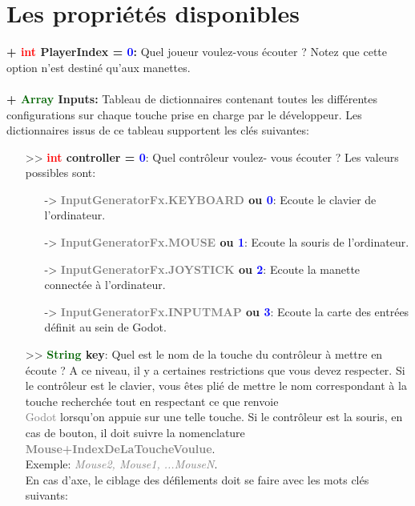 \documentclass[a4paper, 11pt]{article}
\begin{document}
	\section{Les propriétés disponibles}
	\textbf{+ \textcolor{red}{int} PlayerIndex = \textcolor{blue}{0}:} Quel joueur voulez-vous écouter ? 
	Notez que cette option n'est destiné qu'aux manettes.\\\\
	\textbf{+ \textcolor{darkgreen}{Array} Inputs:} Tableau de dictionnaires contenant toutes les 
	différentes configurations sur chaque touche prise en charge par le développeur. Les dictionnaires issus 
	de ce tableau supportent les clés suivantes:
	\begin{itemize}
		\item[>> \textbf{\textcolor{red}{int} controller = \textcolor{blue}{0}}:] Quel contrôleur voulez-
		vous écouter ? Les valeurs possibles sont:
		\begin{itemize}
			\item[-> \textbf{\textcolor{gray}{InputGeneratorFx.KEYBOARD} ou \textcolor{blue}{0}}:] Ecoute le 
			clavier de l'ordinateur.
			\item[-> \textbf{\textcolor{gray}{InputGeneratorFx.MOUSE} ou \textcolor{blue}{1}}:] Ecoute la 
			souris de l'ordinateur.
			\item[-> \textbf{\textcolor{gray}{InputGeneratorFx.JOYSTICK} ou \textcolor{blue}{2}}:] Ecoute la 
			manette connectée à l'ordinateur.
			\item[-> \textbf{\textcolor{gray}{InputGeneratorFx.INPUTMAP} ou \textcolor{blue}{3}}:] Ecoute la 
			carte des entrées définit au sein de Godot.\\
		\end{itemize}
		\item[>> \textbf{\textcolor{darkgreen}{String} key}:] Quel est le nom de la touche du contrôleur à
		mettre en écoute ? A ce niveau, il y a certaines restrictions que vous devez respecter. Si le 
		contrôleur est le clavier, vous êtes plié de mettre le nom correspondant à la touche recherchée tout 
		en respectant ce que renvoie \textcolor{gray}{\\Godot} lorsqu'on appuie sur une telle touche. Si le 
		contrôleur est la souris, en cas de bouton, il doit suivre la nomenclature \textcolor{gray}
		{\textbf{Mouse+IndexDeLaToucheVoulue}}. \\Exemple: \textcolor{gray}{\textit{Mouse2, Mouse1, 
		...MouseN}}. \\En cas d'axe, le ciblage des défilements doit se faire avec les mots clés suivants: 

\end{itemize}
\end{document}
